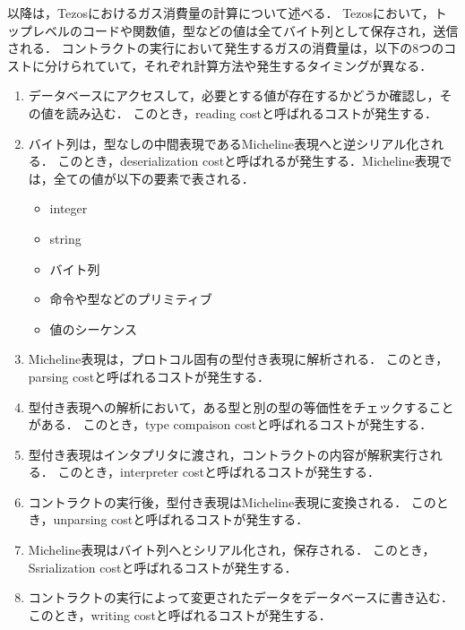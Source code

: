 \documentclass{kuisthesis}
\begin{document}
以降は，Tezosにおけるガス消費量の計算について述べる．
Tezosにおいて，トップレベルのコードや関数値，型などの値は全てバイト列として保存され，送信される．
コントラクトの実行において発生するガスの消費量は，以下の8つのコストに分けられていて，それぞれ計算方法や発生するタイミングが異なる．

\begin{enumerate}
  \item データベースにアクセスして，必要とする値が存在するかどうか確認し，その値を読み込む．
  このとき，reading costと呼ばれるコストが発生する．
  \item バイト列は，型なしの中間表現であるMicheline表現へと逆シリアル化される．
  このとき，deserialization costと呼ばれるが発生する．Micheline表現では，全ての値が以下の要素で表される．
  \begin{itemize}
    \item integer
    \item string
    \item バイト列
    \item 命令や型などのプリミティブ
    \item 値のシーケンス
  \end{itemize}
  \item Micheline表現は，プロトコル固有の型付き表現に解析される．
  このとき，parsing costと呼ばれるコストが発生する．
  \item 型付き表現への解析において，ある型と別の型の等価性をチェックすることがある．
  このとき，type compaison costと呼ばれるコストが発生する．
  \item 型付き表現はインタプリタに渡され，コントラクトの内容が解釈実行される．
  このとき，interpreter costと呼ばれるコストが発生する．
  \item コントラクトの実行後，型付き表現はMicheline表現に変換される．
  このとき，unparsing costと呼ばれるコストが発生する．
  \item Micheline表現はバイト列へとシリアル化され，保存される．
  このとき，Ssrialization costと呼ばれるコストが発生する．
  \item コントラクトの実行によって変更されたデータをデータベースに書き込む．
  このとき，writing costと呼ばれるコストが発生する．
\end{enumerate}
\end{document}
